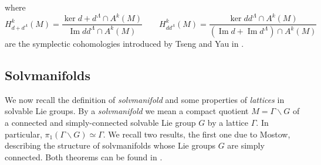\documentclass[a4paper, 11pt]{amsart}
\theoremstyle{plain}
\newtheorem{teorema}{Theorem} [section]
\theoremstyle{definition}
\DeclareMathOperator{\im}{Im}
\numberwithin{equation}{section}
\begin{document}
{where 
\[H^{k}_{d+d^{\Lambda}}(M) = \dfrac{\ker d+d^{\Lambda} \cap A^{k}(M)}{\im dd^{\Lambda} \cap A^{k}(M)} \qquad H^{k}_{dd^{\Lambda}}(M) = \dfrac{\ker dd^{\Lambda} \cap A^{k}(M)}{(\im d+\im d^{\Lambda}) \cap A^{k}(M)}\]
are the symplectic cohomologies introduced by Tseng and Yau in \cite{TY}. 

%
%
%
%
%

\subsection{Solvmanifolds} We now recall the definition of \textit{solvmanifold} and some properties of \textit{lattices} in solvable Lie groups. 
By a {\em solvmanifold} we mean a compact quotient $M=\Gamma \backslash G$ of a connected and simply-connected solvable Lie group $G$ by a lattice $\Gamma$. In particular, $\pi_{1}(\Gamma \backslash G) \simeq \Gamma$. 
We recall two results, the first one due to Mostow, describing the structure of solvmanifolds whose Lie groups $G$ are simply connected. Both theorems can be found in \cite[Theorem 3.6 and Corollary to Proposition 3.7]{Raghunathan}.

}
\end{document}
